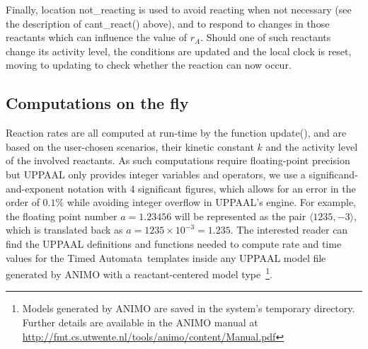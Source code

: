 \documentclass{llncs}
\newcommand{\tas}{Timed Automata}
\begin{document}
Finally, location {\sf not\_reacting} is used to avoid reacting when not necessary (see the description
of {\sf cant\_react()} above), and to respond to changes in those reactants
which can influence the value of $r_A$. Should one of such reactants change its activity level, the
conditions are updated and the local clock is reset, moving to {\sf updating} to check whether the reaction can now
occur.

\subsection{Computations on the fly}\label{sec:rates-ta-model}
Reaction rates are all computed at run-time by the function {\sf update()},
and are based on the user-chosen scenarios, their kinetic constant $k$ and the activity level of the involved reactants.
As such computations require floating-point precision but UPPAAL only provides integer
variables and operators, we use a significand-and-exponent notation with 4 significant figures, which allows for an error
in the order of $0.1 \%$ while 
avoiding integer overflow in UPPAAL's engine.
For example, the floating point number $a = 1.23456$ will be represented as the pair $\langle 1235, -3 \rangle$,
which is translated back as $a = 1235 \times 10^{-3} = 1.235$.
The interested reader can find the UPPAAL definitions and functions needed to compute rate and time values for the \tas\ templates
inside any UPPAAL model file generated by ANIMO with a reactant-centered model type~\footnote{Models generated
by ANIMO are saved in the system's temporary directory. Further details are available in
the ANIMO manual at \url{http://fmt.cs.utwente.nl/tools/animo/content/Manual.pdf}}.
\end{document}

